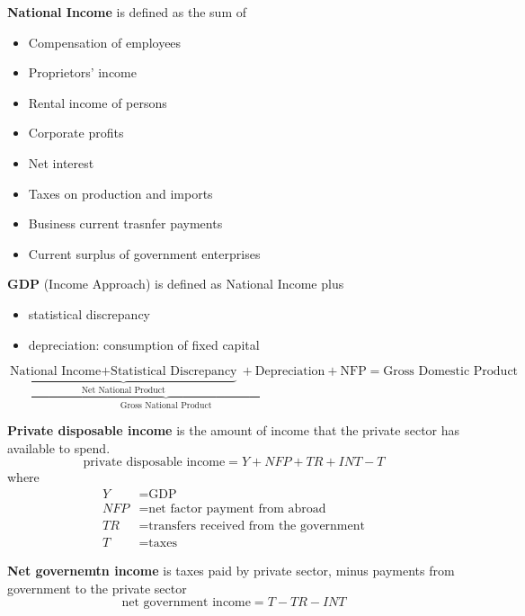 \begin{definition}
    \textbf{National Income} is defined as the sum of 
    \begin{itemize}
        \item Compensation of employees
        \item Proprietors' income 
        \item Rental income of persons
        \item Corporate profits
        \item Net interest
        \item Taxes on production and imports
        \item Business current trasnfer payments
        \item Current surplus of government enterprises
    \end{itemize} 



    \textbf{GDP} (Income Approach) is defined as National Income plus
    \begin{itemize}
        \item statistical discrepancy
        \item depreciation: consumption of fixed capital
    \end{itemize} 
\end{definition}

\begin{remarks}
\[
\underbrace{
\underbrace{
    \text{National Income}
    + \text{Statistical Discrepancy}
}_{\text{Net National Product}}
+ \text{Depreciation}
}_{\text{Gross National Product}}
+ \text{NFP}
= \text{Gross Domestic Product}
\]
\end{remarks}

\begin{definition}
    \textbf{Private disposable income} is the amount of income that the private sector has available to spend.
    \[
        \text{private disposable income} = Y + NFP + TR + INT - T
    \]
    where 
    \begin{align*}
        Y &= \text{GDP} \\
        NFP &= \text{net factor payment from abroad} \\
        TR &= \text{transfers received from the government} \\
        T &= \text{taxes}
    \end{align*}
\end{definition}

\begin{definition}
    \textbf{Net governemtn income} is taxes paid by private sector, minus payments from government to the private sector 
    \[
        \text{net government income} = T - TR - INT
    \]
\end{definition}

